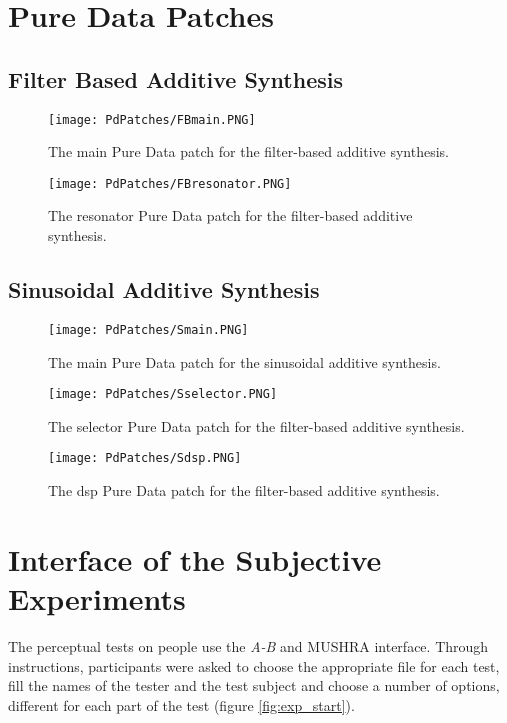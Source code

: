 \chapter{Pure Data Patches}\label{ap:pd_patches}

\section{Filter Based Additive Synthesis}
\begin{figure}[H]
  \centering
    \texttt{[image: PdPatches/FBmain.PNG]}
      \caption{The main Pure Data patch for the filter-based additive synthesis.}
      \label{fig:FBmain}
\end{figure}

\begin{figure}[H]
  \centering
    \texttt{[image: PdPatches/FBresonator.PNG]}
      \caption{The resonator Pure Data patch for the filter-based additive synthesis.}
      \label{fig:FBres}
\end{figure}

\section{Sinusoidal Additive Synthesis}

\begin{figure}[H]
  \centering
    \texttt{[image: PdPatches/Smain.PNG]}
      \caption{The main Pure Data patch for the sinusoidal additive synthesis.}
      \label{fig:Smain}
\end{figure}

\begin{figure}[H]
  \centering
    \texttt{[image: PdPatches/Sselector.PNG]}
      \caption{The selector Pure Data patch for the filter-based additive synthesis.}
      \label{fig:Ssel}
\end{figure}

\begin{figure}[H]
  \centering
    \texttt{[image: PdPatches/Sdsp.PNG]}
      \caption{The dsp Pure Data patch for the filter-based additive synthesis.}
      \label{fig:Sdsp}
\end{figure}

\chapter{Interface of the Subjective Experiments}\label{ap:experiments}
The perceptual tests on people use the \textit{A-B} and \gls{MUSHRA} interface. Through instructions, participants were asked to choose the appropriate file for each test, fill the names of the tester and the test subject and choose a number of options, different for each part of the test (figure \ref{fig:exp_start}).

